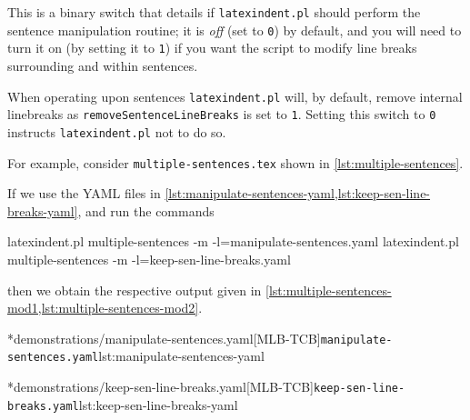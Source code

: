 	This is a binary switch that details if \texttt{latexindent.pl} should perform the sentence manipulation routine; it is \emph{off} (set to \texttt{0}) by default, and you will need to turn it on (by setting it to \texttt{1}) if you want the script to modify line breaks surrounding and within sentences.

	When operating upon sentences \texttt{latexindent.pl} will, by default, remove internal linebreaks as \texttt{removeSentenceLineBreaks} is set to \texttt{1}.
	Setting this switch to \texttt{0} instructs \texttt{latexindent.pl} not to do so.

	For example, consider \texttt{multiple-sentences.tex} shown in \cref{lst:multiple-sentences}.


	If we use the YAML files in \cref{lst:manipulate-sentences-yaml,lst:keep-sen-line-breaks-yaml}, and run the commands \begin{widepage} \begin{commandshell}
latexindent.pl multiple-sentences -m -l=manipulate-sentences.yaml
latexindent.pl multiple-sentences -m -l=keep-sen-line-breaks.yaml
	\end{commandshell} \end{widepage} then we obtain the respective output given in \cref{lst:multiple-sentences-mod1,lst:multiple-sentences-mod2}.

	\begin{minipage}{.5\linewidth}
	\end{minipage}
	\hfill
	\begin{minipage}{.5\linewidth}
		\cmhlistingsfromfile[style=yaml-LST]*{demonstrations/manipulate-sentences.yaml}[MLB-TCB]{\texttt{manipulate-sentences.yaml}}{lst:manipulate-sentences-yaml}
	\end{minipage}

	\begin{minipage}{.5\linewidth}
	\end{minipage}
	\hfill
	\begin{minipage}{.5\linewidth}
		\cmhlistingsfromfile[style=yaml-LST]*{demonstrations/keep-sen-line-breaks.yaml}[MLB-TCB]{\texttt{keep-sen-line-breaks.yaml}}{lst:keep-sen-line-breaks-yaml}
	\end{minipage}

